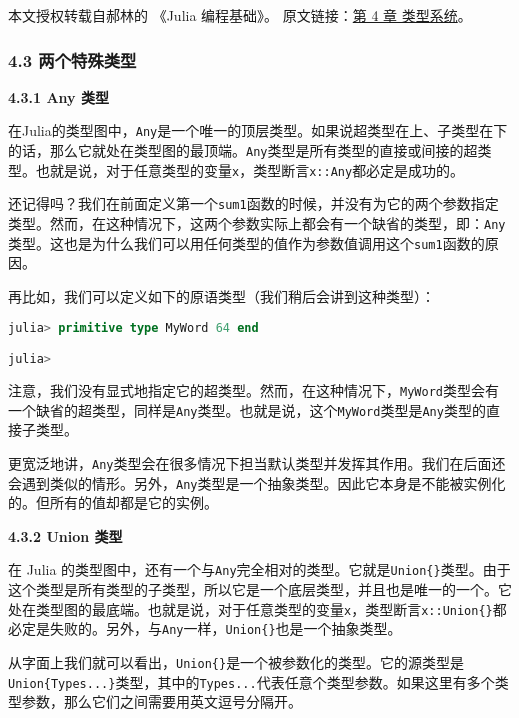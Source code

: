 
本文授权转载自郝林的 《Julia 编程基础》。 原文链接：\href{https://github.com/hyper0x/JuliaBasics/blob/master/book/ch04.md}{第 4 章 类型系统}。


\subsubsection{4.3 两个特殊类型}

\textbf{4.3.1 Any 类型}

在Julia的类型图中，\verb`Any`是一个唯一的顶层类型。如果说超类型在上、子类型在下的话，那么它就处在类型图的最顶端。\verb`Any`类型是所有类型的直接或间接的超类型。也就是说，对于任意类型的变量\verb`x`，类型断言\verb`x::Any`都必定是成功的。

还记得吗？我们在前面定义第一个\verb`sum1`函数的时候，并没有为它的两个参数指定类型。然而，在这种情况下，这两个参数实际上都会有一个缺省的类型，即：\verb`Any`类型。这也是为什么我们可以用任何类型的值作为参数值调用这个\verb`sum1`函数的原因。

再比如，我们可以定义如下的原语类型（我们稍后会讲到这种类型）：

\begin{lstlisting}[language=julia]
julia> primitive type MyWord 64 end

julia> 
\end{lstlisting}

注意，我们没有显式地指定它的超类型。然而，在这种情况下，\verb`MyWord`类型会有一个缺省的超类型，同样是\verb`Any`类型。也就是说，这个\verb`MyWord`类型是\verb`Any`类型的直接子类型。

更宽泛地讲，\verb`Any`类型会在很多情况下担当默认类型并发挥其作用。我们在后面还会遇到类似的情形。另外，\verb`Any`类型是一个抽象类型。因此它本身是不能被实例化的。但所有的值却都是它的实例。

\textbf{4.3.2 Union{} 类型}

在 Julia 的类型图中，还有一个与\verb`Any`完全相对的类型。它就是\verb`Union{}`类型。由于这个类型是所有类型的子类型，所以它是一个底层类型，并且也是唯一的一个。它处在类型图的最底端。也就是说，对于任意类型的变量\verb`x`，类型断言\verb`x::Union{}`都必定是失败的。另外，与\verb`Any`一样，\verb`Union{}`也是一个抽象类型。

从字面上我们就可以看出，\verb`Union{}`是一个被参数化的类型。它的源类型是\verb`Union{Types...}`类型，其中的\verb`Types...`代表任意个类型参数。如果这里有多个类型参数，那么它们之间需要用英文逗号分隔开。

